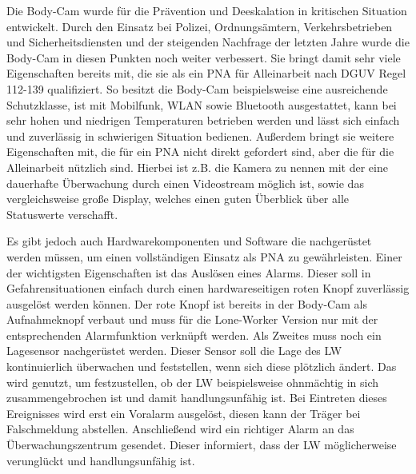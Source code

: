 \documentclass[thesis.tex]{subfiles}
\begin{document}
Die Body-Cam wurde für die Prävention und Deeskalation in kritischen Situation entwickelt.
Durch den Einsatz bei Polizei, Ordnungsämtern, Verkehrsbetrieben und Sicherheitsdiensten und der steigenden Nachfrage der letzten Jahre wurde die Body-Cam in diesen Punkten noch weiter verbessert.
Sie bringt damit sehr viele Eigenschaften bereits mit, die sie als ein PNA für Alleinarbeit nach DGUV Regel 112-139 \cite[]{Regel_112-139} qualifiziert.
So besitzt die Body-Cam beispielsweise eine ausreichende Schutzklasse, ist mit Mobilfunk, WLAN sowie Bluetooth ausgestattet, kann bei sehr hohen und niedrigen Temperaturen betrieben werden und lässt sich einfach und zuverlässig in schwierigen Situation bedienen.
Außerdem bringt sie weitere Eigenschaften mit, die für ein PNA nicht direkt gefordert sind, aber die für die Alleinarbeit nützlich sind.
Hierbei ist z.B. die Kamera zu nennen mit der eine dauerhafte Überwachung durch einen Videostream möglich ist, sowie das vergleichsweise große Display, welches einen guten Überblick über alle Statuswerte verschafft.

Es gibt jedoch auch Hardwarekomponenten und Software die nachgerüstet werden müssen, um einen vollständigen Einsatz als PNA zu gewährleisten.
Einer der wichtigsten Eigenschaften ist das Auslösen eines Alarms.
Dieser soll in Gefahrensituationen einfach durch einen hardwareseitigen roten Knopf zuverlässig ausgelöst werden können.
Der rote Knopf ist bereits in der Body-Cam als Aufnahmeknopf verbaut und muss für die Lone-Worker Version nur mit der entsprechenden Alarmfunktion verknüpft werden.
Als Zweites muss noch ein Lagesensor nachgerüstet werden.
Dieser Sensor soll die Lage des LW kontinuierlich überwachen und feststellen, wenn sich diese plötzlich ändert.
Das wird genutzt, um festzustellen, ob der LW beispielsweise ohnmächtig in sich zusammengebrochen ist und damit handlungsunfähig ist.
Bei Eintreten dieses Ereignisses wird erst ein Voralarm ausgelöst, diesen kann der Träger bei Falschmeldung abstellen.
Anschließend wird ein richtiger Alarm an das Überwachungszentrum gesendet.
Dieser informiert, dass der LW möglicherweise verunglückt und handlungsunfähig ist.
\end{document}
